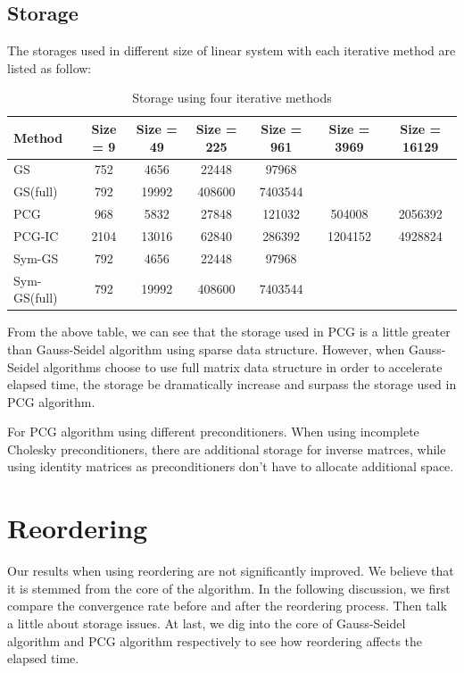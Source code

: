 \documentclass{article}
\begin{document}
\subsection{Storage}
The storages used in different size of linear system with each iterative method are listed as follow:


\begin{table}[h]
\begin{center}
\begin{tabular}{lcccccc}
\hline
Method & Size = 9 & Size = 49 & Size = 225 & Size = 961 & Size = 3969 & Size = 16129\\
\hline
GS & 752 & 4656 & 22448 & 97968 & &\\
GS(full) & 792 & 19992 & 408600 & 7403544 & &\\
PCG & 968 & 5832 & 27848 & 121032 & 504008 & 2056392\\
PCG-IC & 2104 & 13016 & 62840 & 286392 & 1204152 & 4928824\\
Sym-GS & 792 & 4656 & 22448 & 97968 & &\\
Sym-GS(full) & 792 & 19992 & 408600 & 7403544 & &\\
\hline
\end{tabular}
\caption{Storage using four iterative methods}
\end{center}
\end{table}

From the above table, we can see that the storage used in PCG is a little greater than Gauss-Seidel algorithm using sparse data structure. However, when Gauss-Seidel algorithms choose to use full matrix data structure in order to accelerate elapsed time, the storage be dramatically increase and surpass the storage used in PCG algorithm. 

For PCG algorithm using different preconditioners. When using incomplete Cholesky preconditioners, there are additional storage for inverse matrces, while using identity matrices as preconditioners don't have to allocate additional space.

\section{Reordering}

Our results when using reordering are not significantly improved. We believe that it is stemmed from the core of the algorithm. In the following discussion, we first compare the convergence rate before and after the reordering process. Then talk a little about storage issues. At last, we dig into the core of Gauss-Seidel algorithm and PCG algorithm respectively to see how reordering affects the elapsed time.
\end{document}
